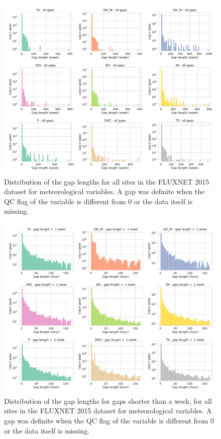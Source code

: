 \documentclass{article}
\newcommand{\imgwidth}{6in}
\begin{document}


\begin{figure}
\centerline{\includegraphics[width=\imgwidth]{gap_len_dist}}
\caption{Distribution of the gap lengths for all sites in the FLUXNET 2015 dataset for meteorological variables. A gap was definite when the QC flag of the variable is different from 0 or the data itself is missing.}
\label{fig:gap_len_dist}
\end{figure}
\begin{figure}
\centerline{\includegraphics[width=\imgwidth]{gap_len_dist_small}}
\caption{Distribution of the gap lengths for gaps shorter than a week, for all sites in the FLUXNET 2015 dataset for meteorological variables. A gap was definite when the QC flag of the variable is different from 0 or the data itself is missing.}
\label{fig:gap_len_dist_small}
\end{figure}
\end{document}
